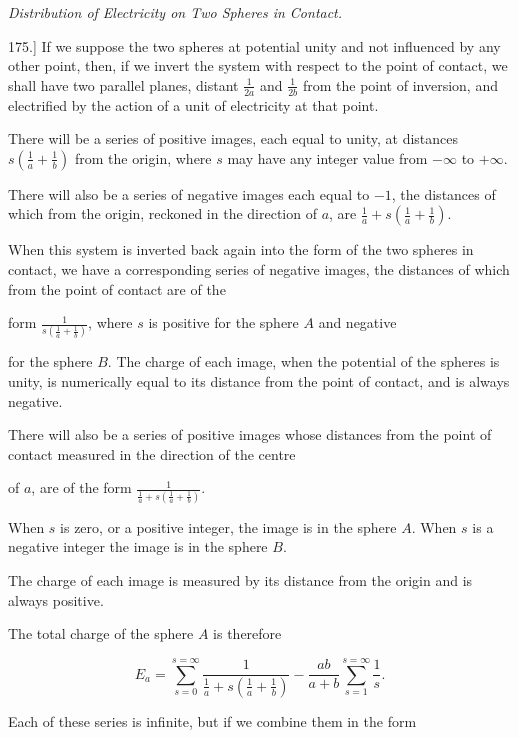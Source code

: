 \documentclass[11pt,a4paper]{article}
\begin{document}
\begin{center}
\textit{Distribution of Electricity on Two Spheres in Contact.}
\end{center}

175.] If we suppose the two spheres at potential unity and not influenced by any other point, then, if we invert the system with respect to the point of contact, we shall have two parallel planes, distant $\frac{1}{2a}$ and $\frac{1}{2b}$ from the point of inversion, and electrified by the action of a unit of electricity at that point.

There will be a series of positive images, each equal to unity, at distances $s\left(\frac{1}{a}+\frac{1}{b}\right)$ from the origin, where $s$ may have any integer value from $-\infty$ to $+\infty$.

There will also be a series of negative images each equal to $-1$, the distances of which from the origin, reckoned in the direction of $a$, are $\frac{1}{a}+s\left(\frac{1}{a}+\frac{1}{b}\right)$.

When this system is inverted back again into the form of the two spheres in contact, we have a corresponding series of negative images, the distances of which from the point of contact are of the

form $\frac{1}{s\left(\frac{1}{a}+\frac{1}{b}\right)}$, where $s$ is positive for the sphere $A$ and negative

for the sphere $B$. The charge of each image, when the potential of the spheres is unity, is numerically equal to its distance from the point of contact, and is always negative.

There will also be a series of positive images whose distances from the point of contact measured in the direction of the centre

of $a$, are of the form $\frac{1}{\frac{1}{a}+s\left(\frac{1}{a}+\frac{1}{b}\right)}$.

When $s$ is zero, or a positive integer, the image is in the sphere $A$. When $s$ is a negative integer the image is in the sphere $B$.

The charge of each image is measured by its distance from the origin and is always positive.

The total charge of the sphere $A$ is therefore

\[
E_a
= \sum_{s=0}^{s=\infty}
  \frac{1}{\frac{1}{a}+s\left(\frac{1}{a}+\frac{1}{b}\right)}
  -\frac{ab}{a+b}\sum_{s=1}^{s=\infty}\frac{1}{s}.
\]

Each of these series is infinite, but if we combine them in the form
\end{document}

